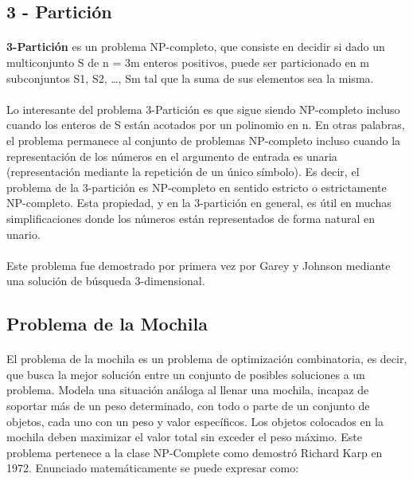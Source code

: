 \documentclass[11pt, a4paper,spanish]{article}
\begin{document}
			\subsection{3 - Partición}

				\paragraph{}
				{\bf 3-Partición} es un problema NP-completo, que consiste en decidir si dado un multiconjunto S de n = 3m enteros positivos, puede ser particionado en m subconjuntos S1, S2, …, Sm tal que la suma de sus elementos sea la misma.
			
				\paragraph{}
				Lo interesante del problema 3-Partición es que sigue siendo NP-completo incluso cuando los enteros de S están acotados por un polinomio en n. En otras palabras, el problema permanece al conjunto de problemas NP-completo incluso cuando la representación de los números en el argumento de entrada es unaria (representación mediante la repetición de un único símbolo). Es decir, el problema de la 3-partición es NP-completo en sentido estricto o estrictamente NP-completo. Esta propiedad, y en la 3-partición en general, es útil en muchas simplificaciones donde los números están representados de forma natural en unario.
	
				\paragraph{}
				Este problema fue demostrado por primera vez por Garey y Johnson mediante una solución de búsqueda 3-dimensional.
		
			\subsection{Problema de la Mochila}
				
				\paragraph{}
				El problema de la mochila es un problema de optimización combinatoria, es decir, que busca la mejor solución entre un conjunto de posibles soluciones a un problema. Modela una situación análoga al llenar una mochila, incapaz de soportar más de un peso determinado, con todo o parte de un conjunto de objetos, cada uno con un peso y valor específicos. Los objetos colocados en la mochila deben maximizar el valor total sin exceder el peso máximo. Este problema pertenece a la clase NP-Complete como demostró  Richard Karp en 1972. Enunciado matemáticamente se puede expresar como: 
				
\end{document}
